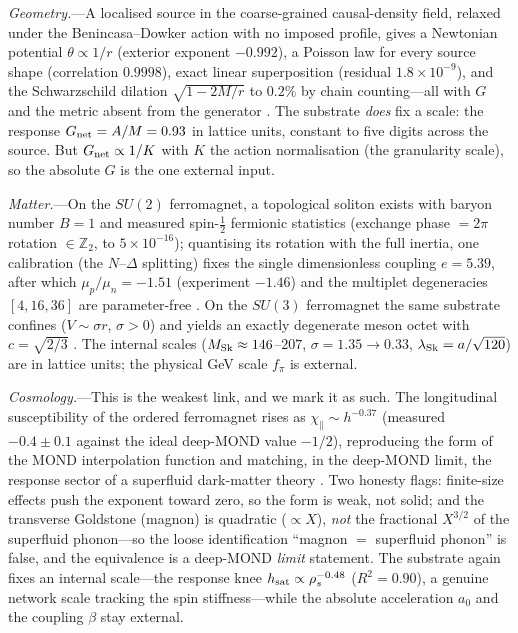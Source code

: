 \documentclass[aps,prl,reprint,nofootinbib,superscriptaddress,floatfix]{revtex4-2}
\begin{document}
\emph{Geometry.}---A localised source in the coarse-grained causal-density field, relaxed
under the Benincasa--Dowker action with no imposed profile, gives a Newtonian potential
$\theta\propto1/r$ (exterior exponent $-0.992$), a Poisson law for every source shape
(correlation $0.9998$), exact linear superposition (residual $1.8\times10^{-9}$), and the
Schwarzschild dilation $\sqrt{1-2M/r}$ to $0.2\%$ by chain counting---all with $G$ and the
metric absent from the generator \cite{MatterGravityPRD,TEICDoc1}. The substrate \emph{does} fix a
scale: the response $G_{\rm net}=A/M=0.93$ in lattice units, constant to five digits across
the source. But $G_{\rm net}\propto1/K$ with $K$ the action normalisation (the granularity
scale), so the absolute $G$ is the one external input.

\emph{Matter.}---On the $SU(2)$ ferromagnet, a topological soliton exists with baryon
number $B=1$ and measured spin-$\tfrac12$ fermionic statistics (exchange phase $=2\pi$
rotation $\in\mathbb{Z}_2$, to $5\times10^{-16}$); quantising its rotation with the full
inertia, one calibration (the $N$--$\Delta$ splitting) fixes the single dimensionless
coupling $e=5.39$, after which $\mu_p/\mu_n=-1.51$ (experiment $-1.46$) and the multiplet
degeneracies $[4,16,36]$ are parameter-free \cite{MatterGravityPRD,AdkinsNappiWitten1983}. On the
$SU(3)$ ferromagnet the same substrate confines ($V\sim\sigma r$, $\sigma>0$) and yields an
exactly degenerate meson octet with $c=\sqrt{2/3}$ \cite{SU3PRD}. The internal scales
($M_{\rm Sk}\approx146$--$207$, $\sigma=1.35\to0.33$, $\lambda_{\rm Sk}=a/\sqrt{120}$) are
in lattice units; the physical GeV scale $f_\pi$ is external.

\emph{Cosmology.}---This is the weakest link, and we mark it as such. The longitudinal
susceptibility of the ordered ferromagnet rises as $\chi_\parallel\sim h^{-0.37}$
(measured $-0.4\pm0.1$ against the ideal deep-MOND value $-1/2$), reproducing the form of
the MOND interpolation function and matching, in the deep-MOND limit, the response sector
of a superfluid dark-matter theory \cite{PaperIV}. Two honesty flags: finite-size effects
push the exponent toward zero, so the form is weak, not solid; and the transverse Goldstone
(magnon) is quadratic ($\propto X$), \emph{not} the fractional $X^{3/2}$ of the superfluid
phonon---so the loose identification ``magnon $=$ superfluid phonon'' is false, and the
equivalence is a deep-MOND \emph{limit} statement. The substrate again fixes an internal
scale---the response knee $h_{\rm sat}\propto\rho_s^{-0.48}$ ($R^2=0.90$), a genuine
network scale tracking the spin stiffness---while the absolute acceleration $a_0$ and the
coupling $\beta$ stay external.
\end{document}
